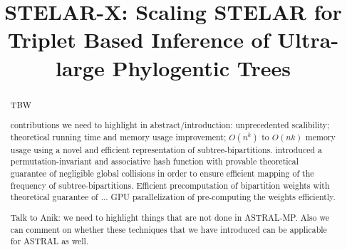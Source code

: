 \documentclass[runningheads]{llncs}
\newcommand{\add}[1]{{\color{blue} #1}}
\newcommand{\add}[1]{{\color{blue} #1}}
\newcommand{\addr}[1]{{\color{red} #1}}
\begin{document}
%
\title{STELAR-X: Scaling STELAR for Triplet Based Inference of Ultra-large Phylogentic Trees}










%
\maketitle              %
%
\begin{abstract}
TBW
\add{contributions we need to highlight in abstract/introduction: unprecedented scalibility; theoretical running time and memory usage improvement; $O(n^k)$ to $O(nk)$ memory usage using a novel and efficient representation of subtree-bipartitions. introduced a permutation-invariant and associative hash function with provable theoretical guarantee of negligible global collisions in order to ensure efficient mapping of the frequency of subtree-bipartitions. Efficient precomputation of bipartition weights with theoretical guarantee of ... GPU parallelization of pre-computing the weights efficiently.

\addr{Talk to Anik: we need to highlight things that are not done in ASTRAL-MP. Also we can comment on whether these techniques that we have introduced can be applicable for ASTRAL as well.}}



\end{abstract}
%
%
%
\end{document}
